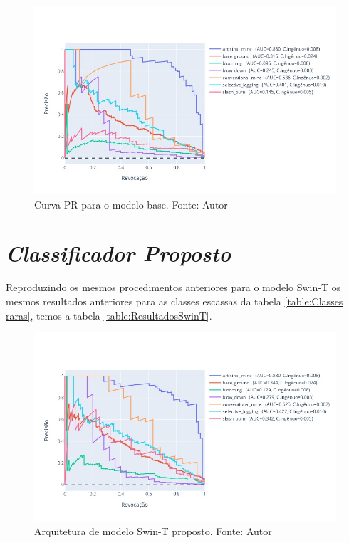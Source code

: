 \begin{figure}[!ht]
    \centering
    \includegraphics[width=\columnwidth]{Imagens/results/rsp-resnet-50_planet_pt/Curva PR para classes raras.jpg}
    \caption{ Curva PR para o modelo base.
    Fonte: Autor}
   \label{fig:CurvaPRResnet50}
\end{figure}   

   


\section{\textit{Classificador Proposto}}\label{sec:Cap4_ClassifiadorProposto}

Reproduzindo os mesmos procedimentos anteriores para o modelo Swin-T os mesmos resultados anteriores para as classes escassas da tabela \ref{table:Classes raras}, temos a tabela \ref{table:ResultadosSwinT}. 

\begin{figure}[!ht]
    \centering
    \includegraphics[width=\columnwidth]{Imagens/results/rsp-swin-t_planet_pt/Curva PR para classes raras.jpg}
    \caption{ Arquitetura de modelo Swin-T proposto.
    Fonte: Autor}
    \label{fig:CurvaPRSwint}
\end{figure}   

